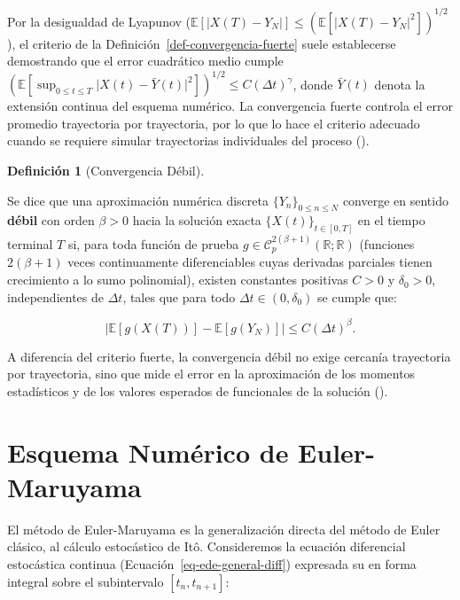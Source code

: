 \documentclass[
  spanish,
  us-letterpaper,
]{scrreprt}
\numberwithin{equation}{section}
\theoremstyle{plain}
\theoremstyle{plain}
\theoremstyle{plain}
\theoremstyle{definition}
\newtheorem{definition}{Definición}[chapter]
\theoremstyle{remark}
\begin{document}
Por la desigualdad de Lyapunov
(\(\mathbb{E}[\vert X(T) - Y_N \vert] \le (\mathbb{E}[\vert X(T) - Y_N \vert^2])^{1/2}\)),
el criterio de la Definición~\ref{def-convergencia-fuerte} suele
establecerse demostrando que el error cuadrático medio cumple
\(\displaystyle \left(\mathbb{E}\left[\sup_{0 \le t \le T} \vert X(t) - \bar{Y}(t) \vert^2\right]\right)^{1/2} \le C(\Delta t)^\gamma\),
donde \(\bar{Y}(t)\) denota la extensión continua del esquema numérico.
La convergencia fuerte controla el error promedio trayectoria por
trayectoria, por lo que lo hace el criterio adecuado cuando se requiere
simular trayectorias individuales del proceso
().

\begin{definition}[Convergencia
Débil]\protect\hypertarget{def-convergencia-debil}{}\label{def-convergencia-debil}

Se dice que una aproximación numérica discreta
\(\{Y_n\}_{0 \le n \le N}\) converge en sentido \textbf{débil} con orden
\(\beta > 0\) hacia la solución exacta \(\{X(t)\}_{t \in [0, T]}\) en el
tiempo terminal \(T\) si, para toda función de prueba
\(g \in \mathcal{C}_p^{2(\beta+1)}(\mathbb{R}; \mathbb{R})\) (funciones
\(2(\beta+1)\) veces continuamente diferenciables cuyas derivadas
parciales tienen crecimiento a lo sumo polinomial), existen constantes
positivas \(C > 0\) y \(\delta_0 > 0\), independientes de \(\Delta t\),
tales que para todo \(\Delta t \in (0, \delta_0)\) se cumple que:

\[
\left\vert \mathbb{E}[g(X(T))] - \mathbb{E}[g(Y_N)] \right\vert \le C (\Delta t)^\beta.
\]

\end{definition}

A diferencia del criterio fuerte, la convergencia débil no exige
cercanía trayectoria por trayectoria, sino que mide el error en la
aproximación de los momentos estadísticos y de los valores esperados de
funcionales de la solución ().

\section{Esquema Numérico de Euler-Maruyama}\label{sec-euler-maruyama}

El método de Euler-Maruyama es la generalización directa del método de
Euler clásico, al cálculo estocástico de Itô. Consideremos la ecuación
diferencial estocástica continua (Ecuación~\ref{eq-ede-general-diff})
expresada su en forma integral sobre el subintervalo \([t_n, t_{n+1}]:\)
\end{document}
